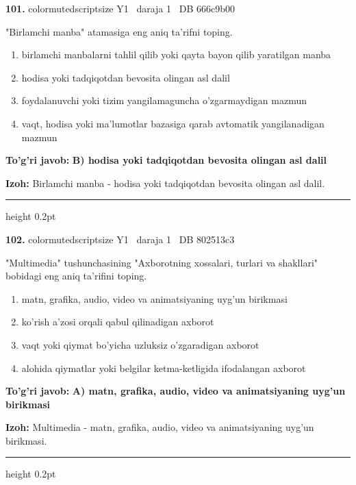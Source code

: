 \documentclass[10pt,a4paper,oneside]{article}
\begin{document}
\noindent\textbf{\color{ink}101.}  {color{muted}scriptsize Y1 \textbullet\ daraja 1 \textbullet\ DB 666c9b00}
\par
"Birlamchi manba" atamasiga eng aniq ta'rifni toping.
\begin{enumerate}[label=\Alph*),leftmargin=9mm]
\item birlamchi manbalarni tahlil qilib yoki qayta bayon qilib yaratilgan manba
\item hodisa yoki tadqiqotdan bevosita olingan asl dalil
\item foydalanuvchi yoki tizim yangilamaguncha o'zgarmaydigan mazmun
\item vaqt, hodisa yoki ma'lumotlar bazasiga qarab avtomatik yangilanadigan mazmun
\end{enumerate}
\begin{tcolorbox}[enhanced,breakable,colback=teal!4,colframe=teal!50!black,boxrule=0.5pt,arc=1.1mm,left=3mm,right=3mm,top=1.7mm,bottom=1.7mm,before skip=2mm,after skip=2mm]
\textbf{\color{teal}To'g'ri javob:} \textbf{B) hodisa yoki tadqiqotdan bevosita olingan asl dalil}
\par\smallskip
\textbf{Izoh:} Birlamchi manba - hodisa yoki tadqiqotdan bevosita olingan asl dalil.
\end{tcolorbox}
\vspace{2mm}\hrule height 0.2pt \vspace{3mm}

\noindent\textbf{\color{ink}102.}  {color{muted}scriptsize Y1 \textbullet\ daraja 1 \textbullet\ DB 802513c3}
\par
"Multimedia" tushunchasining "Axborotning xossalari, turlari va shakllari" bobidagi eng aniq ta'rifini toping.
\begin{enumerate}[label=\Alph*),leftmargin=9mm]
\item matn, grafika, audio, video va animatsiyaning uyg'un birikmasi
\item ko'rish a'zosi orqali qabul qilinadigan axborot
\item vaqt yoki qiymat bo'yicha uzluksiz o'zgaradigan axborot
\item alohida qiymatlar yoki belgilar ketma-ketligida ifodalangan axborot
\end{enumerate}
\begin{tcolorbox}[enhanced,breakable,colback=teal!4,colframe=teal!50!black,boxrule=0.5pt,arc=1.1mm,left=3mm,right=3mm,top=1.7mm,bottom=1.7mm,before skip=2mm,after skip=2mm]
\textbf{\color{teal}To'g'ri javob:} \textbf{A) matn, grafika, audio, video va animatsiyaning uyg'un birikmasi}
\par\smallskip
\textbf{Izoh:} Multimedia - matn, grafika, audio, video va animatsiyaning uyg'un birikmasi.
\end{tcolorbox}
\vspace{2mm}\hrule height 0.2pt \vspace{3mm}
\end{document}
